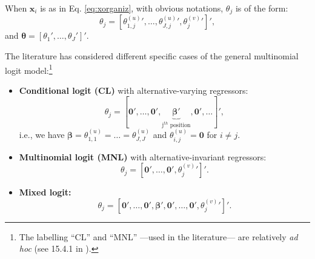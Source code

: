 \documentclass[
  12pt,
]{book}
\providecommand{\tightlist}{%
  \setlength{\itemsep}{0pt}\setlength{\parskip}{0pt}}
\theoremstyle{definition}
\theoremstyle{definition}
\theoremstyle{definition}
\theoremstyle{definition}
\theoremstyle{remark}
\begin{document}
When \(\mathbf{x}_i\) is as in Eq. \eqref{eq:xorganiz}, with obvious notations, \(\theta_j\) is of the form:
\begin{equation}
\theta_j = [{\theta^{(u)}_{1,j}}',\dots,{\theta^{(u)}_{J,j}}',{\theta_j^{(v)}}']',\label{eq:thetaOrganiz}
\end{equation}
and \(\boldsymbol\theta=[\theta_1',\dots,\theta_J']'\).

The literature has considered different specific cases of the general multinomial logit model:\footnote{The labelling ``CL'' and ``MNL'' ---used in the literature--- are relatively \emph{ad hoc} (see 15.4.1 in \citet{Cameron_Trivedi_2005}).}

\begin{itemize}
\tightlist
\item
  \textbf{Conditional logit (CL)} with alternative-varying regressors:
  \begin{equation}
  \theta_j = [\mathbf{0}',\dots,\mathbf{0}',\underbrace{\boldsymbol\beta'}_{\mbox{j$^{th}$ position}},\mathbf{0}',\dots]',\label{eq:thetaOrganizCL}
  \end{equation}
  i.e., we have \(\boldsymbol\beta=\theta^{(u)}_{1,1}=\dots=\theta^{(u)}_{J,J}\) and \(\theta^{(u)}_{i,j}=\mathbf{0}\) for \(i \ne j\).
\item
  \textbf{Multinomial logit (MNL)} with alternative-invariant regressors:
  \begin{equation}
  \theta_j = \left[\mathbf{0}',\dots,\mathbf{0}',{\theta_j^{(v)}}'\right]'.\label{eq:thetaOrganizML}
  \end{equation}
\item
  \textbf{Mixed logit:}
  \begin{equation}
  \theta_j = \left[\mathbf{0}',\dots,\mathbf{0}',\boldsymbol\beta',\mathbf{0}',\dots,\mathbf{0}',{\theta_j^{(v)}}'\right]'.\label{eq:thetaOrganizCL}
  \end{equation}
\end{itemize}
\end{document}
